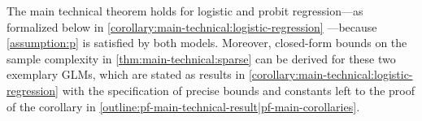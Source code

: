 
The main technical theorem holds for logistic and probit regression---as formalized below in \COROLLARY \ref{corollary:main-technical:logistic-regression}%
---because \ASSUMPTION \ref{assumption:p} is satisfied by both models.
Moreover,
closed-form bounds on the sample complexity in \THEOREM \ref{thm:main-technical:sparse} can be derived for these two
exemplary
GLMs, which are stated as \orderwise results in \COROLLARY \ref{corollary:main-technical:logistic-regression} %
with the specification of precise bounds and constants left to the proof of the corollary in \APPENDIX \ref{outline:pf-main-technical-result|pf-main-corollaries}.

